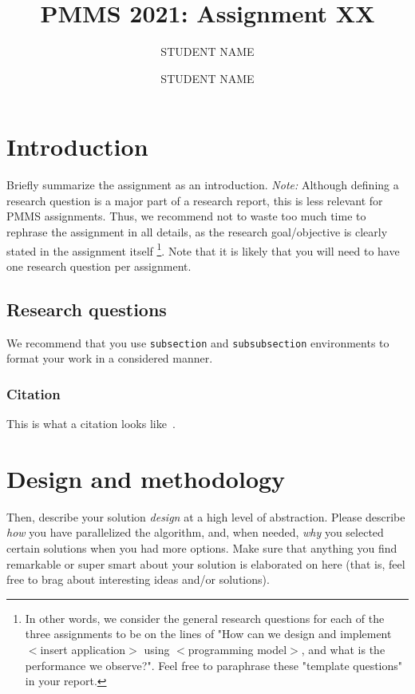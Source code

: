 \documentclass[a4paper,UKenglish,cleveref, autoref, thm-restate]{lipics-v2019}
\title{PMMS 2021: Assignment XX }
\author{STUDENT NAME}{STUDENT NUMBER}{EMAIL ADDRESS}{}{}
\author{STUDENT NAME}{STUDENT NUMBER}{EMAIL ADDRESS}{}{}
\begin{document}
	\maketitle
	


	
	\section{Introduction}
		Briefly summarize the assignment as an introduction. \textit{Note:} Although defining a research question is a major part of a research report, this is less relevant for PMMS assignments. Thus, we recommend not to waste too much time to rephrase the assignment in all details, as the research goal/objective is clearly stated in the assignment itself \footnote{In other words, we consider the general research questions for each of the three assignments to be on the lines of "How can we design and implement $<$insert application$>$ using $<$programming model$>$, and what is the performance we observe?". Feel free to paraphrase these "template questions" in your report.}. Note that it is likely that you will need to have one research question per assignment.

	\subsection{Research questions}
		We recommend that you use \texttt{subsection} and \texttt{subsubsection} environments to format your work in a considered manner.  

	\subsubsection{Citation}
		This is what a citation looks like~\cite{temp}.
		
	\section{Design and methodology}
		Then, describe your solution \textit{design} at a high level of abstraction. Please describe \textit{how} you have parallelized the algorithm, and, when needed, \textit{why} you selected certain solutions when you had more options. Make sure that anything you find remarkable or super smart about your solution is elaborated on here (that is, feel free to brag about interesting ideas and/or solutions).
	
\end{document}
